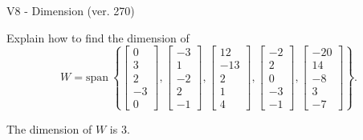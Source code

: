 \begin{exercise}
  \begin{exerciseTitle}V8 - Dimension (ver. 270)\end{exerciseTitle}
  \begin{exerciseStatement}
    Explain how to find the dimension of 
\[W=\mathrm{span}\ \left\{\left[\begin{array}{r}
0 \\
3 \\
2 \\
-3 \\
0
\end{array}\right] , \left[\begin{array}{r}
-3 \\
1 \\
-2 \\
2 \\
-1
\end{array}\right] , \left[\begin{array}{r}
12 \\
-13 \\
2 \\
1 \\
4
\end{array}\right] , \left[\begin{array}{r}
-2 \\
2 \\
0 \\
-3 \\
-1
\end{array}\right] , \left[\begin{array}{r}
-20 \\
14 \\
-8 \\
3 \\
-7
\end{array}\right]\right\}.\]



  \end{exerciseStatement}
  \begin{exerciseAnswer}
   The dimension of \(W\) is  \(3\).
  


  \end{exerciseAnswer}
\end{exercise}